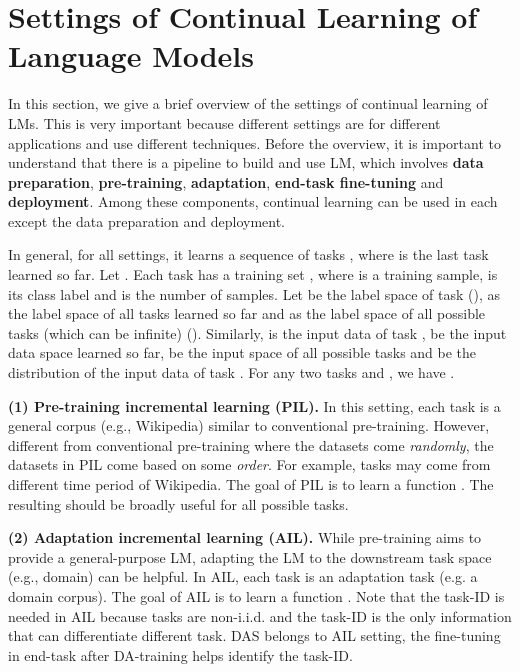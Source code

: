 \documentclass{article} \usepackage{iclr2023_conference,times}
\newcommand{\zixuan}[1]{{\color{red}{\small\bf\sf [zixuan: #1]}}}
\begin{document}
\iffalse
{\color{red}
\section{Settings of Continual Learning of Language Models}
\label{sec.setting}


In this section, we give a brief overview of the settings of continual learning of LMs. This is very important because different settings are for different applications and use different techniques. Before the overview, it is important to understand that there is a pipeline to build and use LM, which involves \textbf{data preparation}, \textbf{pre-training}, \textbf{adaptation}, \textbf{end-task fine-tuning} and \textbf{deployment}. Among these components, continual learning can be used in each except the data preparation and deployment. 

In general, for all settings, it learns a sequence of tasks , where  is the last task learned so far. Let . Each task  has a training set , where  is a training sample,  is its class label and  is the number of samples. Let  be the label space of task  (),  as the label space of all tasks learned so far and  as the label space of all possible tasks (which can be infinite) (). 
Similarly,  is the input data of task ,  be the input data space learned so far,  be the input space of all possible tasks and
 be the distribution of the input data of task . For any two tasks  and , we have . 

\textbf{(1) Pre-training incremental learning (PIL).} In this setting, each task is a general corpus (e.g., Wikipedia) similar to conventional pre-training. However, different from conventional pre-training where the datasets come \textit{randomly}, the datasets in PIL come based on some \textit{order}. For example, tasks may come from different time period of Wikipedia. The goal of PIL is to learn a function . The resulting  should be broadly useful for all possible tasks. 

\zixuan{I think the goal should show the goal of generalization. there are may still have forgetting issue because of misalignment. No work on PIL yet}

\textbf{(2) Adaptation incremental learning (AIL).} While pre-training aims to provide a general-purpose LM, adapting the LM to the downstream task space (e.g., domain) can be helpful. In AIL, each task is an adaptation task (e.g. a domain corpus). The goal of AIL is to learn a function . Note that the task-ID is needed in AIL because tasks are non-i.i.d. and the task-ID is the only information that can differentiate different task. DAS belongs to AIL setting, the fine-tuning in end-task after DA-training helps identify the task-ID.

}
\end{document}
